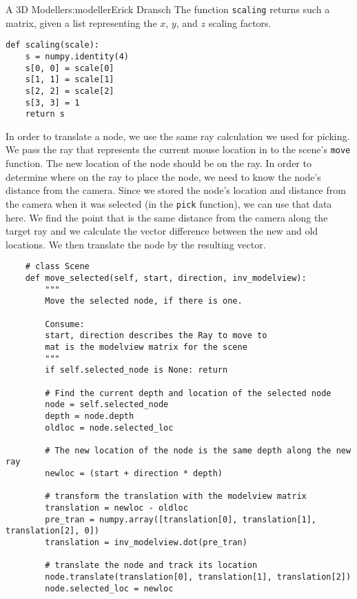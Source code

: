 \begin{aosachapter}{A 3D Modeller}{s:modeller}{Erick Dransch}
The function \texttt{scaling} returns such a matrix, given a list
representing the $x$, $y$, and $z$ scaling factors.

\begin{verbatim}
def scaling(scale):
    s = numpy.identity(4)
    s[0, 0] = scale[0]
    s[1, 1] = scale[1]
    s[2, 2] = scale[2]
    s[3, 3] = 1
    return s
\end{verbatim}

\label{moving-nodes}

In order to translate a node, we use the same ray calculation we used
for picking. We pass the ray that represents the current mouse location
in to the scene's \texttt{move} function. The new location of the node
should be on the ray. In order to determine where on the ray to place
the node, we need to know the node's distance from the camera. Since we
stored the node's location and distance from the camera when it was
selected (in the \texttt{pick} function), we can use that data here. We
find the point that is the same distance from the camera along the
target ray and we calculate the vector difference between the new and
old locations. We then translate the node by the resulting vector.

\begin{verbatim}
    # class Scene
    def move_selected(self, start, direction, inv_modelview):
        """ 
        Move the selected node, if there is one.
            
        Consume: 
        start, direction describes the Ray to move to
        mat is the modelview matrix for the scene 
        """
        if self.selected_node is None: return
    
        # Find the current depth and location of the selected node
        node = self.selected_node
        depth = node.depth
        oldloc = node.selected_loc
    
        # The new location of the node is the same depth along the new ray
        newloc = (start + direction * depth)
    
        # transform the translation with the modelview matrix
        translation = newloc - oldloc
        pre_tran = numpy.array([translation[0], translation[1], translation[2], 0])
        translation = inv_modelview.dot(pre_tran)
    
        # translate the node and track its location
        node.translate(translation[0], translation[1], translation[2])
        node.selected_loc = newloc
\end{verbatim}


\end{aosachapter}

